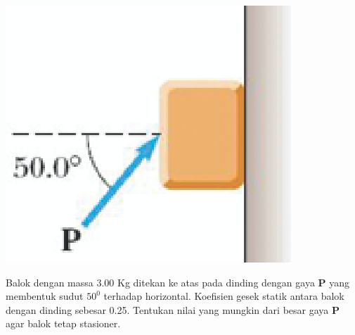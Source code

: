 \begin{center}
\includegraphics [scale=0.6]{./latex/eps/1_5_14_image_1.eps}
\end{center}

Balok dengan massa 3.00 Kg ditekan ke atas pada dinding dengan gaya \textbf{P} yang membentuk sudut $50^{0}$ terhadap horizontal. Koefisien gesek statik antara balok dengan dinding sebesar 0.25. Tentukan nilai yang mungkin dari besar gaya \textbf{P} agar balok tetap stasioner.

